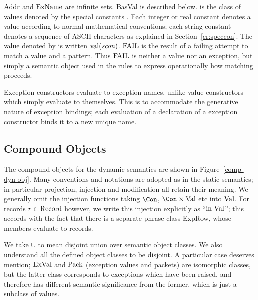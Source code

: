 ${\rm Addr}$ and ${\rm ExName}$ are infinite sets. BasVal is described below.
{\SVal} is the class of values denoted by the special constants
\SCon. Each integer or real constant denotes a value according to normal 
mathematical conventions; each string constant denotes a sequence of ASCII
characters as explained in Section~\ref{cr:speccon}. The value denoted
by {\scon} is written $\mathop{\rm val}\nolimits({\it scon})$.
${\rm FAIL}$ is the result of a failing attempt to match a value and a
pattern. Thus ${\rm FAIL}$ is neither a value nor an exception, but simply
a semantic object used in the rules to express operationally
how matching proceeds.

Exception constructors evaluate to exception names, unlike value constructors
which simply evaluate to themselves. This is to accommodate the generative
nature of exception bindings; each evaluation of a declaration of a
exception constructor binds it to a new unique name.

\subsection{Compound Objects}

The compound objects for the dynamic semantics are
shown in Figure~\ref{comp-dyn-obj}.
Many conventions and notations are adopted as in the static semantics; in
particular projection, injection and modification all retain
their meaning.  We generally omit the injection functions taking $\Con$,
$\Con\times\Val$ etc into ${\rm Val}$. For records $r\in{\rm Record}$ however,
we write this injection explicitly as ``$\mbox{\rm in}\ {\rm Val}$''; this accords with
the fact that there is a separate phrase class ExpRow, whose members
evaluate to records. 

We take $\cup$ to mean disjoint union over
semantic object classes. We also understand all the defined object
classes to be disjoint. A particular case deserves mention; ${\rm ExVal}$
and ${\rm Pack}$ (exception values and packets) are isomorphic classes,
but the latter class corresponds to exceptions which have been
raised, and therefore has different semantic significance from the
former, which is just a subclass of values.


